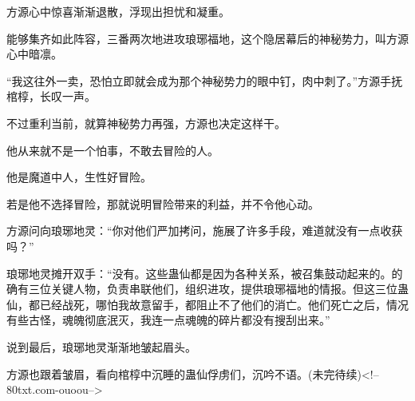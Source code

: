 \begin{this_body}
方源心中惊喜渐渐退散，浮现出担忧和凝重。

能够集齐如此阵容，三番两次地进攻琅琊福地，这个隐居幕后的神秘势力，叫方源心中暗凛。

“我这往外一卖，恐怕立即就会成为那个神秘势力的眼中钉，肉中刺了。”方源手抚棺椁，长叹一声。

不过重利当前，就算神秘势力再强，方源也决定这样干。

他从来就不是一个怕事，不敢去冒险的人。

他是魔道中人，生性好冒险。

若是他不选择冒险，那就说明冒险带来的利益，并不令他心动。

方源问向琅琊地灵：“你对他们严加拷问，施展了许多手段，难道就没有一点收获吗？”

琅琊地灵摊开双手：“没有。这些蛊仙都是因为各种关系，被召集鼓动起来的。的确有三位关键人物，负责串联他们，组织进攻，提供琅琊福地的情报。但这三位蛊仙，都已经战死，哪怕我故意留手，都阻止不了他们的消亡。他们死亡之后，情况有些古怪，魂魄彻底泯灭，我连一点魂魄的碎片都没有搜刮出来。”

说到最后，琅琊地灵渐渐地皱起眉头。

方源也跟着皱眉，看向棺椁中沉睡的蛊仙俘虏们，沉吟不语。(未完待续)<!--80txt.com-ouoou-->

\end{this_body}

